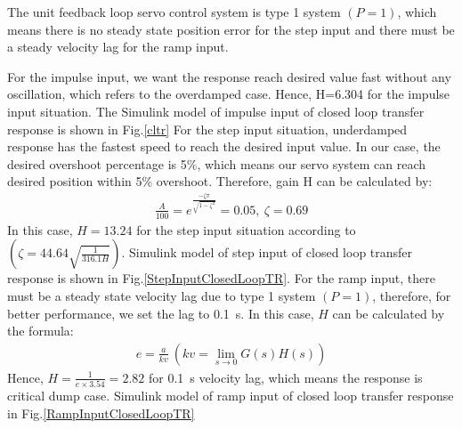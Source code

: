 \documentclass[conference]{IEEEtran}
\begin{document}
The unit feedback loop servo control system is type 1 system $(P=1)$, which means there is no steady state position error for the step input and there must be a steady velocity lag for the ramp input.

For the impulse input, we want the response reach desired value fast without any oscillation, which refers to the overdamped case. Hence, H=6.304 for the impulse input situation. The Simulink model of impulse input of closed loop transfer response is shown in Fig.\ref{cltr}
For the step input situation, underdamped response has the fastest speed to reach the desired input value. In our case, the desired overshoot percentage is 5\%, which means our servo system can reach desired position within 5\% overshoot. Therefore, gain H can be calculated by:
\begin{align}
    \frac{A}{100} = e^{\frac{-\zeta \pi}{\sqrt{1-\zeta^2}}} = 0.05, \ \zeta = 0.69
\end{align}
In this case, $H = 13.24$ for the step input situation according to $(\zeta = 44.64 \sqrt{\frac{1}{316.1H}})$. Simulink model of step input of closed loop transfer response is shown in Fig.\ref{StepInputClosedLoopTR}. For the ramp input, there must be a steady state velocity lag due to type 1 system $(P=1)$, therefore, for better performance, we set the lag to \SI{0.1}{\second}. In this case, $H$ can be calculated by the formula:
\begin{align}
    e = \frac{a}{kv} \ (kv = \lim_{s \rightarrow 0} G(s) H(s))
\end{align}
Hence, $H=\frac{1}{e \times 3.54} = 2.82$ for \SI{0.1}{\second} velocity lag, which means the response is critical dump case. Simulink model of ramp input of closed loop transfer response in Fig.\ref{RampInputClosedLoopTR}
\end{document}
